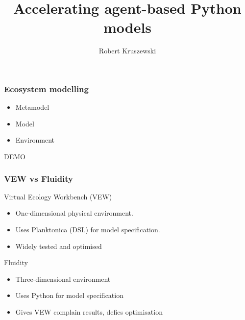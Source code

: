 \documentclass[t]{beamer}
\author{Robert Kruszewski}
\title[Accelerating agent-based Python models]{Accelerating agent-based Python models}
\begin{document}
\frame{\maketitle}

\begin{frame}
\frametitle{\huge Ecosystem modelling}
\begin{itemize}
	\item Metamodel
	\item Model
	\item Environment
\end{itemize}
\end{frame}


\begin{frame}[c]

\begin{center}
{\fontsize{48pt}{1em}\selectfont DEMO}
\end{center}

\end{frame}


\begin{frame}
\frametitle{VEW vs Fluidity}
\Large Virtual Ecology Workbench (VEW) \normalsize
\begin{itemize}
	\item One-dimensional physical environment.
	\item Uses Planktonica (DSL) for model specification.
	\item Widely tested and optimised
\end{itemize}
\vspace{12pt}
\Large Fluidity \normalsize
\begin{itemize}
	\item Three-dimensional environment
	\item Uses Python for model specification
	\item Gives VEW complain results, defies optimisation
\end{itemize}



\end{frame}
\end{document}
